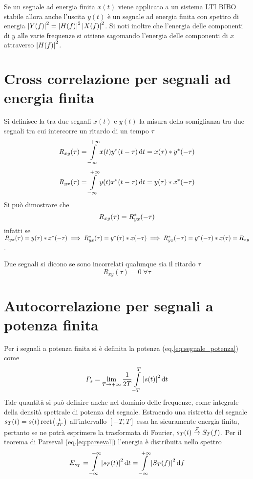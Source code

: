 \begin{nota}Se un segnale ad energia finita $x(t)$ viene applicato a un sistema LTI BIBO stabile allora anche l'uscita $y(t)$ è un segnale ad energia finita con spettro di energia $\left|{Y(f)}\right|^2=\left|{H(f)}\right|^2\left|{X(f)}\right|^2$. Si noti inoltre che l'energia delle componenti di $y$ alle varie frequenze si ottiene sagomando l'energia delle componenti di $x$ attraverso $\left|{H(f)}\right|^2$.\end{nota}

\section{Cross correlazione per segnali ad energia finita}
Si definisce la  tra due segnali $x(t)$ e $y(t)$ la misura della somiglianza tra due segnali tra cui intercorre un ritardo di un tempo $\tau$
\begin{equation}R_{xy}(\tau)=\int\limits_{-\infty}^{+\infty}{x(t){y}^\ast(t-\tau)}{\,\mathop{}\!\mathrm{d}{t}}=x(\tau)\ast {y}^\ast(-\tau)\end{equation}
\begin{equation}R_{yx}(\tau)=\int\limits_{-\infty}^{+\infty}{y(t){x}^\ast(t-\tau)}{\,\mathop{}\!\mathrm{d}{t}}=y(\tau)\ast {x}^\ast(-\tau)\end{equation}
Si può dimostrare che 
\[R_{xy}(\tau)=R_{yx}^\ast(-\tau)\]
infatti se $R_{yx}(\tau)=y(\tau)\ast {x}^\ast(-\tau)\implies R_{yx}^\ast(\tau)={y}^\ast(\tau)\ast x(-\tau)\implies R_{yx}^\ast(-\tau)={y}^\ast(-\tau)\ast x(\tau)=R_{xy}$.

Due segnali si dicono  se sono incorrelati qualunque sia il ritardo $\tau$
\[R_{xy}(\tau)=0\;\forall\tau\]

\section{Autocorrelazione per segnali a potenza finita}
Per i segnali a potenza finita si è definita la potenza (eq.\ref{eq:segnale_potenza}) come
\[P_s=\lim\limits_{T\to+\infty}{\frac{1}{2T}\int\limits_{-T}^{T}{\left|{s(t)}\right|^2}{\,\mathop{}\!\mathrm{d}{t}}}\]
Tale quantità si può definire anche nel dominio delle frequenze, come integrale della densità spettrale di potenza del segnale. Estraendo una ristretta del segnale $s_T(t)=s(t)\,{\operatorname{rect}}^{}\!\left({\frac{t}{2T}}\right)$ all'intervallo $[-T,T]$ essa ha sicuramente energia finita, pertanto se ne potrà esprimere la trasformata di Fourier, $s_T(t)\overset{\operatorname{\mathcal{F}}}{\to}S_T(f)$. Per il teorema di Parseval (eq.\ref{eq:parseval}) l'energia è distribuita nello spettro
\[E_{s_T}=\int\limits_{-\infty}^{+\infty}{\left|{s_T(t)}\right|^2}{\,\mathop{}\!\mathrm{d}{t}}=\int\limits_{-\infty}^{+\infty}{\left|{S_T(f)}\right|^2}{\,\mathop{}\!\mathrm{d}{f}}\]


